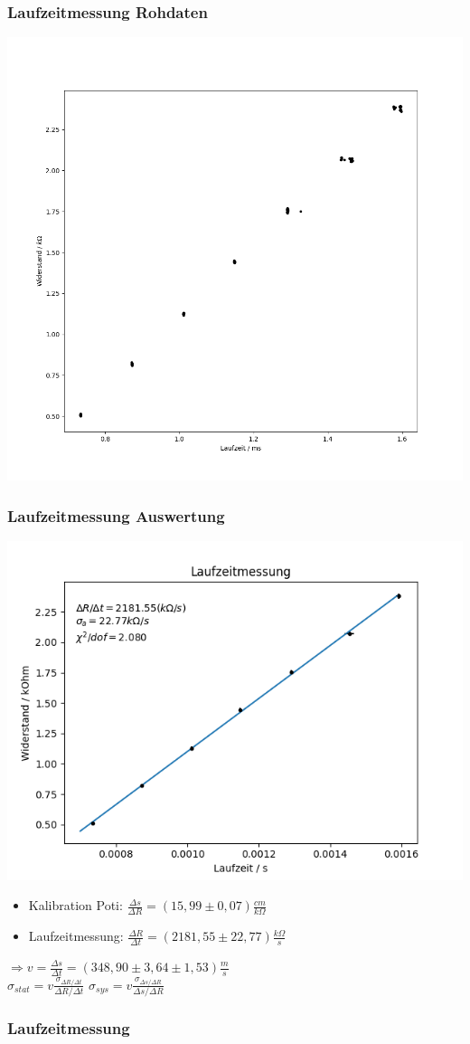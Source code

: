 \documentclass[12pt]{beamer}
\begin{document}
	\begin{frame}
		\frametitle{Laufzeitmessung \qquad Rohdaten}
		\begin{center}
			\includegraphics[width=0.8\linewidth]{rohdaten_laufzeit}
		\end{center}
	\end{frame}

	\begin{frame}
		\frametitle{Laufzeitmessung \qquad Auswertung}
		\begin{center}
			\includegraphics[width=0.6\linewidth]{fit_laufzeit}
		\end{center}
		\begin{itemize}
			\item Kalibration Poti: $\frac{\Delta s}{\Delta R} = (15,99 \pm 0,07) \frac{cm}{k\Omega}$\\ [0.3cm]
			\item Laufzeitmessung: $\frac{\Delta R}{\Delta t} = (2181,55 \pm 22,77) \frac{k\Omega}{s}$
		\end{itemize}
		$\Rightarrow v = \frac{\Delta s}{\Delta t} = (348,90 \pm 3,64 \pm 1,53) \frac{m}{s}$ \\ [0.3cm]
		\qquad $\sigma _{stat} = v \frac{\sigma _{\Delta R/\Delta t}}{\Delta R / \Delta t}$ \qquad $\sigma _{sys} = v \frac{\sigma _{\Delta s/\Delta R}}{\Delta s / \Delta R}$
	\end{frame}

	\begin{frame}
		\frametitle{Laufzeitmessung \qquad}
	\end{frame}
\end{document}
